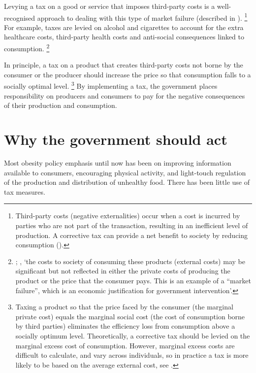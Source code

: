 \documentclass[embargoed]{grattan}
\begin{document}
Levying a tax on a good or service that imposes third-party costs is a well-recognised approach to dealing with this type of market failure (described in ).%
\footnote{Third-party costs (negative externalities) occur when a cost is incurred by parties who are not part of the transaction, resulting in an inefficient level of production.
A corrective tax can provide a net benefit to society by reducing consumption (\textcites{Freebairn2010Taxationobesity}{Greenwald1986Externalitieseconomiesimperfect}).} For example, taxes are levied on alcohol and cigarettes to account for the extra healthcare costs, third-party health costs and anti-social consequences linked to consumption.%
\footnote{\textcite{Bahl2003uneasycasediscriminatory}; \textcite{Organisation2015Usingpricepolicies}, `the costs to society of consuming these products (external costs) may be significant but not reflected in either the private costs of producing the product or the price that the consumer pays.
This is an example of a ``market failure'', which is an economic justification for government intervention'.}

In principle, a tax on a product that creates third-party costs not borne by the consumer or the producer should increase the price so that consumption falls to a socially optimal level.%
\footnote{Taxing a product so that the price faced by the consumer (the marginal private cost) equals the marginal social cost (the cost of consumption borne by third parties) eliminates the efficiency loss from consumption above a socially optimum level.
Theoretically, a corrective tax should be levied on the marginal excess cost of consumption.
However, marginal excess costs are difficult to calculate, and vary across individuals, so in practice a tax is more likely to be based on the average external cost, see \textcite{CnossenExcisetaxationAustralia}.} By implementing a tax, the government places responsibility on producers and consumers to pay for the negative consequences of their production and consumption.

\section{Why the government should act}\label{why-the-government-should-act}

Most obesity policy emphasis until now has been on improving information available to consumers, encouraging physical activity, and light-touch regulation of the production and distribution of unhealthy food.
There has been little use of tax measures.
\end{document}
